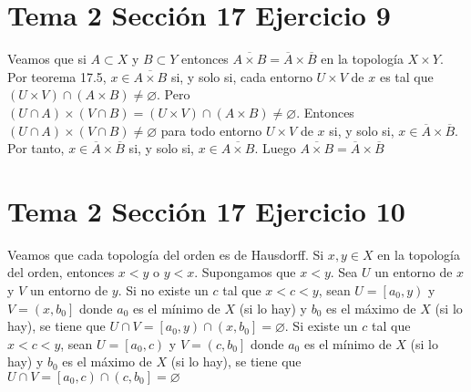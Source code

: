 \documentclass{article}
\begin{document}
\section{Tema 2 Sección 17 Ejercicio 9}
Veamos que si $A\subset X$ y $B\subset Y$ entonces $\overline{A\times B}=\overline{A}\times \overline{B}$ en la topología $X\times Y$. Por teorema 17.5, $x\in \overline{A\times B}$  si, y solo si, cada entorno $U\times V$ de $x$ es tal que $(U\times V)\cap (A\times B)\neq\varnothing$. Pero  $(U\cap A)\times (V\cap B)= (U\times V)\cap (A\times B)\neq\varnothing$. Entonces $(U\cap A)\times (V\cap B)\neq\varnothing$ para todo entorno $U\times V$ de $x$ si, y solo si, $x\in\overline{A}\times \overline{B}$. Por tanto, $x\in\overline{A}\times \overline{B}$ si, y solo si, $x\in\overline{A\times B}$. Luego  $\overline{A\times B}=\overline{A}\times \overline{B}$
\section{Tema 2 Sección 17 Ejercicio 10}
Veamos que cada topología del orden es de Hausdorff. Si $x,y\in X$ en la topología del orden, entonces $x<y$ o $y<x$. Supongamos que $x<y$. Sea $U$ un entorno de $x$  y $V$ un entorno de $y$.  Si no existe un $c$ tal que $x<c<y$, sean $U=\left[a_0,y\right)$ y $V=\left(x,b_0\right]$ donde $a_0$ es el mínimo de $X$ (si lo hay) y $b_0$ es el máximo de $X$ (si lo hay), se tiene que $U\cap V=\left[a_0,y\right)\cap\left(x,b_0\right]=\varnothing$. Si existe un $c$ tal que $x<c<y$, sean $U=\left[a_0,c\right)$ y $V=\left(c,b_0\right]$ donde $a_0$ es el mínimo de $X$ (si lo hay) y $b_0$ es el máximo de $X$ (si lo hay), se tiene que $U\cap V=\left[a_0,c\right)\cap\left(c,b_0\right]=\varnothing$
\end{document}
